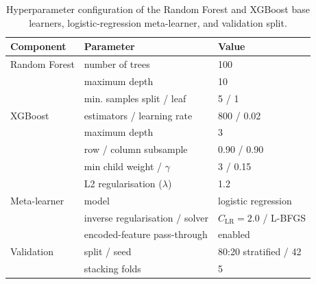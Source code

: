 \documentclass[a4paper,fleqn]{cas-dc}
\begin{document}
\begin{table}[width=\columnwidth,pos=!tbp]
\centering
\caption{Hyperparameter configuration of the Random Forest and XGBoost base learners, logistic-regression meta-learner, and validation split.}
\label{tab:hyper}
\footnotesize
\setlength{\tabcolsep}{3pt}
\renewcommand{\arraystretch}{1.05}
\begin{tabularx}{\columnwidth}{@{}Q{0.21\columnwidth}Q{0.40\columnwidth}Y@{}}
\toprule
Component & Parameter & Value \\
\midrule
Random Forest & number of trees & 100 \\
 & maximum depth & 10 \\
 & min. samples split / leaf & 5 / 1 \\
XGBoost & estimators / learning rate & 800 / 0.02 \\
 & maximum depth & 3 \\
 & row / column subsample & 0.90 / 0.90 \\
 & min child weight / $\gamma$ & 3 / 0.15 \\
 & L2 regularisation ($\lambda$) & 1.2 \\
Meta-learner & model & logistic regression \\
 & inverse regularisation / solver & $C_{\mathrm{LR}}=2.0$ / L-BFGS \\
 & encoded-feature pass-through & enabled \\
Validation & split / seed & 80:20 stratified / 42 \\
 & stacking folds & 5 \\
\bottomrule
\end{tabularx}
\end{table}
\end{document}
